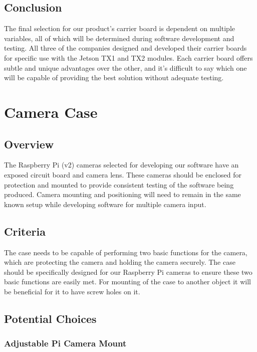 \subsection{Conclusion}

The final selection for our product's carrier board is dependent on multiple variables, 
all of which will be determined during software development and testing. All three of 
the companies 
designed and developed their carrier boards for specific use with the Jetson TX1 and 
TX2 modules. Each carrier board offers subtle and unique 
advantages over the other, and it's difficult to say which one will be capable of 
providing the best solution without adequate testing. \\

\section{Camera Case}

\subsection{Overview}

The Raspberry Pi (v2) cameras selected for developing our software have an exposed circuit 
board and camera lens. These cameras should be enclosed for protection and mounted to 
provide consistent testing of the software being produced. Camera mounting and positioning
will need to remain in the same known setup while developing software for multiple camera 
input. \\

\subsection{Criteria}

The case needs to be capable of performing two basic functions for the camera, which 
are protecting the camera and holding the camera securely. The case should be specifically 
designed for our Raspberry Pi cameras to ensure these two basic functions are easily 
met. For mounting of the case to another object it will be beneficial for it to 
have screw holes on it. \\

\subsection{Potential Choices}

\subsubsection{Adjustable Pi Camera Mount}

